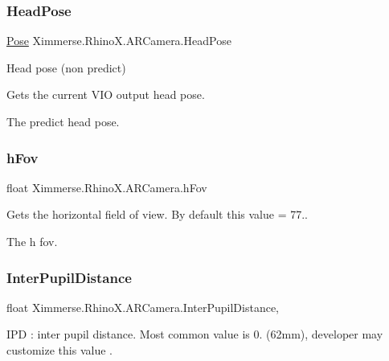 \subsubsection{\texorpdfstring{Head\+Pose}{HeadPose}}
{\footnotesize\ttfamily \mbox{\hyperlink{struct_ximmerse_1_1_rhino_x_1_1_pose}{Pose}} Ximmerse.\+Rhino\+X.\+A\+R\+Camera.\+Head\+Pose\hspace{0.3cm}{\ttfamily [get]}}



Head pose (non predict) 

Gets the current V\+IO output head pose. 

The predict head pose.\mbox{\label{class_ximmerse_1_1_rhino_x_1_1_a_r_camera_ace7c430868896aa5cc911f023a0c4ec2}} 
\subsubsection{\texorpdfstring{h\+Fov}{hFov}}
{\footnotesize\ttfamily float Ximmerse.\+Rhino\+X.\+A\+R\+Camera.\+h\+Fov\hspace{0.3cm}{\ttfamily [get]}}



Gets the horizontal field of view. By default this value = 77.. 

The h fov.\mbox{\label{class_ximmerse_1_1_rhino_x_1_1_a_r_camera_a83ddafe725c4738c84b292501ea9e55f}} 
\subsubsection{\texorpdfstring{Inter\+Pupil\+Distance}{InterPupilDistance}}
{\footnotesize\ttfamily float Ximmerse.\+Rhino\+X.\+A\+R\+Camera.\+Inter\+Pupil\+Distance\hspace{0.3cm}{\ttfamily [get]}, {\ttfamily [set]}}



I\+PD \+: inter pupil distance. Most common value is 0. (62mm), developer may customize this value . 

